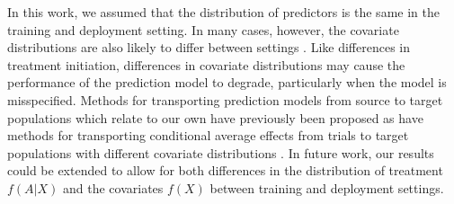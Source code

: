 In this work, we assumed that the distribution of predictors is the same in the training and deployment setting. In many cases, however, the covariate distributions are also likely to differ between settings \cite{bickel_discriminative_2009, sugiyama_covariate_2007}. Like differences in treatment initiation, differences in covariate distributions may cause the performance of the prediction model to degrade, particularly when the model is misspecified. Methods for transporting prediction models from source to target populations which relate to our own have previously been proposed \cite{sugiyama_covariate_2007,bickel_discriminative_2007,sugiyama2012machine, steingrimsson_transporting_2023, li_estimating_2022, morrison_robust_2022} as have methods for transporting conditional average effects from trials to target populations with different covariate distributions \cite{mehrotra_transporting_2021, seamans_generalizability_2021, robertson_estimating_2021, robertson_regression-based_2023}. In future work, our results could be extended to allow for both differences in the distribution of treatment $f(A|X)$ and the covariates $f(X)$ between training and deployment settings.

